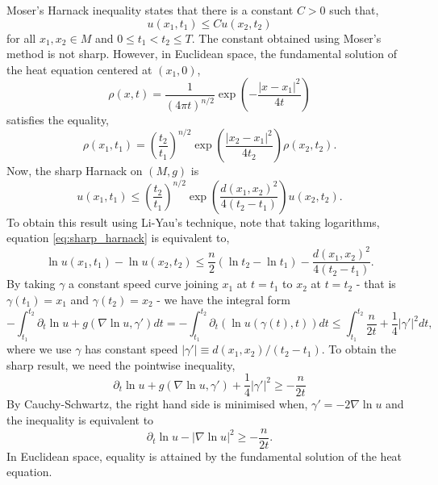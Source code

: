 Moser's Harnack inequality states that there is a constant $C > 0$ such that,
\begin{equation}
\label{eq:moser}
u(x_1, t_1) \leq C u(x_2, t_2)
\end{equation}
for all $x_1, x_2 \in M$ and $0 \leq t_1 < t_2 \leq T$. The constant obtained using Moser's method is not sharp. However, in Euclidean space, the fundamental solution of the heat equation centered at $(x_1, 0)$,
\[
\rho(x, t) = \frac{1}{(4\pi t)^{n/2}} \exp \left(-\frac{|x - x_1|^2}{4 t}\right)
\]
satisfies the equality,
\[
\rho(x_1, t_1) = \left(\frac{t_2}{t_1}\right)^{n/2} \exp\left(\frac{|x_2 - x_1|^2}{4t_2}\right) \rho(x_2, t_2).
\]
Now, the sharp Harnack on $(M, g)$ is
\begin{equation}
\label{eq:sharp_harnack}
u (x_1, t_1) \leq \left(\frac{t_2}{t_1}\right)^{n/2} \exp\left(\frac{d(x_1, x_2)^2}{4(t_2 - t_1)}\right) u (x_2, t_2).
\end{equation}
To obtain this result using Li-Yau's technique, note that taking logarithms, equation \eqref{eq:sharp_harnack} is equivalent to,
\[
\ln u(x_1, t_1) - \ln u (x_2, t_2) \leq \frac{n}{2} (\ln t_2 - \ln t_1) - \frac{d(x_1, x_2)^2}{4(t_2 - t_1)}.
\]
By taking $\gamma$ a constant speed curve joining $x_1$ at $t = t_1$ to $x_2$ at $t = t_2$ - that is $\gamma(t_1) = x_1$ and $\gamma(t_2) = x_2$ - we have the integral form
\begin{equation}
\label{eq:integral_harnack}
-\int_{t_1}^{t_2} \partial_t \ln u + g(\nabla \ln u, \gamma') dt = -\int_{t_1}^{t_2} \partial_t \left(\ln u(\gamma(t), t)\right)  dt \leq \int_{t_1}^{t_2} \frac{n}{2t} + \frac{1}{4} |\gamma'|^2 dt,
\end{equation}
where we use $\gamma$ has constant speed $|\gamma'| \equiv d(x_1, x_2)/(t_2 - t_1)$. To obtain the sharp result, we need the pointwise inequality,
\begin{equation}
\label{eq:pointwise_harnack}
\partial_t \ln u + g(\nabla \ln u, \gamma') + \frac{1}{4} |\gamma'|^2 \geq - \frac{n}{2t}
\end{equation}
By Cauchy-Schwartz, the right hand side is minimised when, $\gamma' = -2 \nabla \ln u$ and the inequality is equivalent to
\begin{equation}
\label{eq:liyau}
\partial_t \ln u - |\nabla \ln u|^2 \geq - \frac{n}{2t}.
\end{equation}
In Euclidean space, equality is attained by the fundamental solution of the heat equation.

